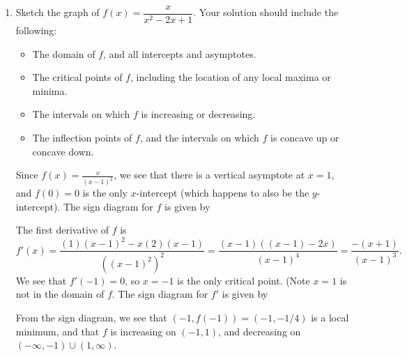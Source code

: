 \documentclass[12pt]{article}
\begin{document}
\thispagestyle{fancy}

 \begin{enumerate}
  \item Sketch the graph of $f(x) = \dfrac{x}{x^2-2x+1}$. Your solution should include the following:
\begin{itemize}
 \item The domain of $f$, and all intercepts and asymptotes.
 \item The critical points of $f$, including the location of any local maxima or minima.
 \item The intervals on which $f$ is increasing or decreasing.
 \item The inflection points of $f$, and the intervals on which $f$ is concave up or concave down.
\end{itemize}

\bigskip

Since $f(x) = \frac{x}{(x-1)^2}$, we see that there is a vertical asymptote at $x=1$, and $f(0)=0$ is the only $x$-intercept (which happens to also be the $y$-intercept). The sign diagram for $f$ is given by
\begin{center}
\end{center}

The first derivative of $f$ is
\[
 f'(x) = \frac{(1)(x-1)^2-x(2)(x-1)}{((x-1)^2)^2} = \frac{(x-1)((x-1)-2x)}{(x-1)^4} = \frac{-(x+1)}{(x-1)^3}.
\]
We see that $f'(-1)=0$, so $x=-1$ is the only critical point. (Note $x=1$ is not in the domain of $f$. The sign diagram for $f'$ is given by
\begin{center}
\end{center}
From the sign diagram, we see that $(-1,f(-1))=(-1,-1/4)$ is a local minimum, and that $f$ is increasing on $(-1,1)$, and decreasing on $(-\infty, -1)\cup (1,\infty)$.


\end{enumerate}
\end{document}
